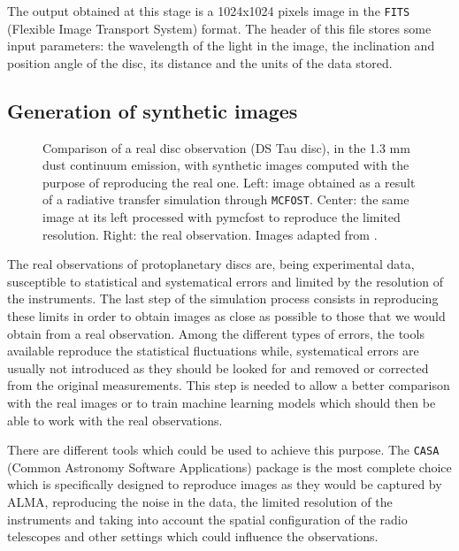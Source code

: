 \documentclass[a4paper,10pt]{report}
\begin{document}
The output obtained at this stage is a 1024x1024 pixels image in the
\lstinline{FITS} (Flexible Image Transport System) format.
The header of this file stores some input parameters: 
the wavelength of the light in the image, the inclination and position angle of
the disc, its distance and the units of the data stored.

\subsection{Generation of synthetic images}

\begin{figure}
    \begin{center}
        \scalebox{0.45}{}
    \end{center}
    \caption{Comparison of a real disc observation (DS Tau disc), in the 1.3 mm dust continuum emission,
    with synthetic images computed with the purpose of reproducing the real one.
    Left: image obtained as a result of a radiative transfer simulation through \lstinline{MCFOST}.
    Center: the same image at its left processed with pymcfost to reproduce the limited
    resolution. Right: the real observation. Images adapted from \citet{dstauv,Long_2018}.}
\end{figure}

The real observations of protoplanetary discs are, being experimental data, susceptible 
to statistical and systematical errors and limited by the resolution of the instruments.
The last step of the simulation process consists in reproducing these limits in order
to obtain images as close as possible to those that we would obtain from a real observation.
Among the different types of errors, the tools available reproduce the
statistical fluctuations while, systematical errors are usually not introduced as they should be 
looked for and removed or corrected from the original measurements.
This step is needed to allow a better comparison with the real images or to train machine learning 
models which should then be able to work with the real observations.

There are different tools which could be used to achieve this purpose.
The \lstinline{CASA} (Common Astronomy Software Applications) package \citep{casa} is the most complete choice 
which is specifically designed to reproduce images as they would be captured by ALMA, reproducing the noise in the data,
the limited resolution of the instruments and taking into account the spatial configuration of the radio telescopes
and other settings which could influence the observations.
\end{document}
